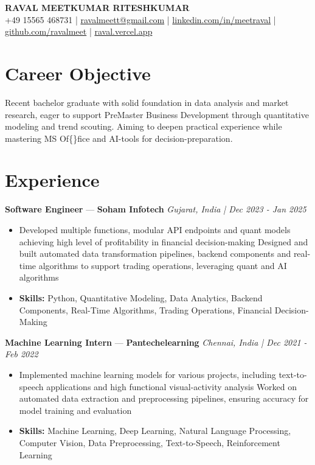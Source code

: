 \documentclass[a4paper,10pt]{article}
\begin{document}
\begin{center}
  {\Large\bfseries RAVAL MEETKUMAR RITESHKUMAR}\\[2pt]
  {\small +49 15565 468731 \;|\; \href{mailto:ravalmeett@gmail.com}{ravalmeett@gmail.com} \;|\; \href{https://www.linkedin.com/in/meetraval/}{linkedin.com/in/meetraval} \;|\; \href{https://github.com/ravalmeet}{github.com/ravalmeet} \;|\; \href{https://raval.vercel.app/}{raval.vercel.app}}
\end{center}
\vspace{-3pt}

\section*{Career Objective}
Recent bachelor graduate with solid foundation in data analysis and market research, eager to support PreMaster Business Development through quantitative modeling and trend scouting. Aiming to deepen practical experience while mastering MS Of\{\}fice and AI-tools for decision-preparation.\par

\section*{Experience}
\textbf{Software Engineer} — \textbf{Soham Infotech} \hfill \textit{Gujarat, India \;|\; Dec 2023 - Jan 2025}\par
\vspace{1pt}
\begin{itemize}
  \item Developed multiple functions, modular API endpoints and quant models achieving high level of profitability in financial decision-making Designed and built automated data transformation pipelines, backend components and real-time algorithms to support trading operations, leveraging quant and AI algorithms
  \item \textbf{Skills:} Python, Quantitative Modeling, Data Analytics, Backend Components, Real-Time Algorithms, Trading Operations, Financial Decision-Making
\end{itemize}
\vspace{3pt}
\textbf{Machine Learning Intern} — \textbf{Pantechelearning} \hfill \textit{Chennai, India \;|\; Dec 2021 - Feb 2022}\par
\vspace{1pt}
\begin{itemize}
  \item Implemented machine learning models for various projects, including text-to-speech applications and high functional visual-activity analysis Worked on automated data extraction and preprocessing pipelines, ensuring accuracy for model training and evaluation
  \item \textbf{Skills:} Machine Learning, Deep Learning, Natural Language Processing, Computer Vision, Data Preprocessing, Text-to-Speech, Reinforcement Learning
\end{itemize}
\end{document}
